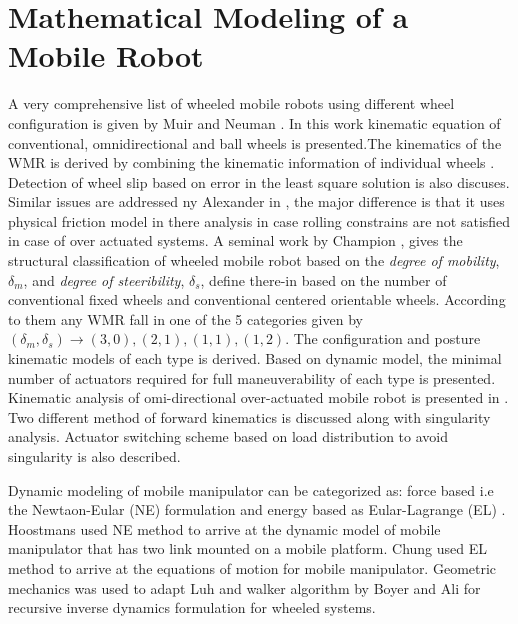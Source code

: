    
\section{Mathematical Modeling of a Mobile Robot}
A very comprehensive list of wheeled mobile robots using different wheel configuration is given by Muir and Neuman \cite{muir1987kinematic}. In this work kinematic equation of conventional, omnidirectional and ball wheels is presented.The kinematics of the WMR is derived by combining the kinematic information of   individual wheels . Detection of wheel slip based on  error in the least square solution is also discuses. Similar issues are addressed ny Alexander in \cite{alexander1989kinematics}, the major difference is that it uses physical friction model in there analysis in case rolling constrains are not satisfied in case of over actuated systems. A seminal work by Champion \cite{campion1996structural}, gives the structural classification of wheeled mobile robot based on the \textit{degree of mobility}, $\delta_m$, and \textit{degree of steeribility}, $\delta_s$, define there-in based on the number of conventional fixed wheels and  conventional centered orientable wheels. According to them any WMR fall in one of the 5 categories given by $(\delta_m,\delta_s)\rightarrow(3,0),(2,1),(1,1),(1,2)$. The configuration and posture kinematic models of each type is derived. Based on  dynamic model, the minimal number of actuators required for full maneuverability of each type is presented. Kinematic analysis of omi-directional over-actuated mobile robot  is presented in \cite{yi2002kinematics}. Two different method of forward kinematics is discussed along with  singularity analysis. Actuator switching scheme based on load distribution to avoid singularity is also described. 

Dynamic modeling of mobile manipulator can be categorized as: force based i.e the Newtaon-Eular (NE) formulation and  energy based as Eular-Lagrange (EL) . Hoostmans \cite{hootsmans1992motion} used NE method to arrive at  the dynamic model of mobile manipulator that has two link mounted on a mobile platform. Chung \cite{chung1998interaction} used EL method to arrive at the equations of motion for mobile manipulator. Geometric mechanics was used to adapt Luh and walker \cite{luh1980line} algorithm  by Boyer and Ali \cite{boyer2011recursive} for recursive inverse dynamics formulation for wheeled systems.   

